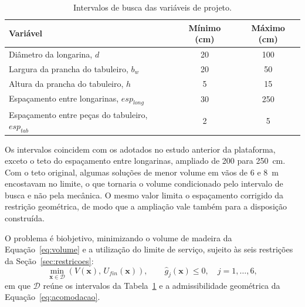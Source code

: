 \begin{table}[!ht]
\centering
\caption{Intervalos de busca das variáveis de projeto.}
\label{tab:intervalos}
\footnotesize
\begin{tabular}{lcc}
\toprule
Variável & Mínimo (cm) & Máximo (cm) \\
\midrule
Diâmetro da longarina, $d$ & 20 & 100 \\
Largura da prancha do tabuleiro, $b_w$ & 20 & 50 \\
Altura da prancha do tabuleiro, $h$ & 5 & 15 \\
Espaçamento entre longarinas, $esp_{long}$ & 30 & 250 \\
Espaçamento entre peças do tabuleiro, $esp_{tab}$ & 2 & 5 \\
\bottomrule
\end{tabular}
\end{table}

Os intervalos coincidem com os adotados no estudo anterior da plataforma, exceto o teto do espaçamento entre longarinas, ampliado de 200 para 250~cm. Com o teto original, algumas soluções de menor volume em vãos de 6 e 8~m encostavam no limite, o que tornaria o volume condicionado pelo intervalo de busca e não pela mecânica. O mesmo valor limita o espaçamento corrigido da restrição geométrica, de modo que a ampliação vale também para a disposição construída.

O problema é biobjetivo, minimizando o volume de madeira da Equação~\eqref{eq:volume} e a utilização do limite de serviço, sujeito às seis restrições da Seção~\ref{sec:restricoes}:
\begin{equation}
\min_{\mathbf{x}\in\mathcal{D}}\left(V(\mathbf{x}),\,U_{fin}(\mathbf{x})\right),
\qquad \widehat g_j(\mathbf{x})\leq0,\quad j=1,\ldots,6,
\label{eq:problema}
\end{equation}
em que $\mathcal{D}$ reúne os intervalos da Tabela~\ref{tab:intervalos} e a admissibilidade geométrica da Equação~\eqref{eq:acomodacao}.

